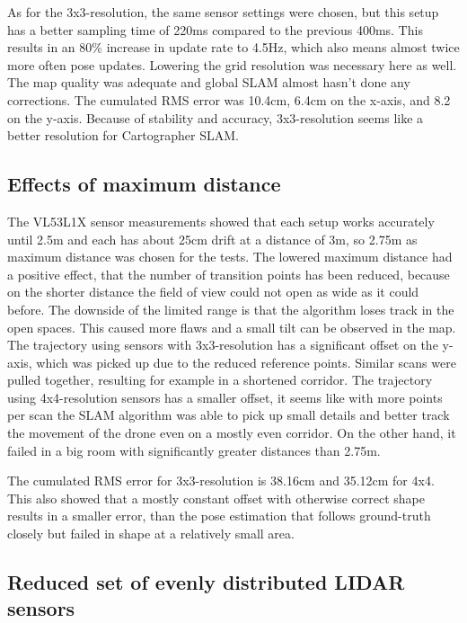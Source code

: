 \documentclass[conference]{IEEEtran}
\begin{document}
As for the 3x3-resolution, the same sensor settings were chosen, but this setup has a better sampling time of 
220ms compared to the previous 400ms. This results in an 80\% increase in update rate to 4.5Hz, which also 
means almost twice more often pose updates. Lowering the grid resolution was necessary here as well. The map 
quality was adequate and global SLAM almost hasn't done any corrections. The cumulated RMS error was 10.4cm, 
6.4cm on the x-axis, and 8.2 on the y-axis. Because of stability and accuracy, 3x3-resolution seems like a 
better resolution for Cartographer SLAM. 

\subsection{Effects of maximum distance}

The VL53L1X sensor measurements showed that each setup works accurately until 2.5m and each has about 25cm 
drift at a distance of 3m, so 2.75m as maximum distance was chosen for the tests. The lowered maximum 
distance had a positive effect, that the number of transition points has been reduced, because on the shorter 
distance the field of view could not open as wide as it could before. The downside of the limited range is 
that the algorithm loses track in the open spaces. This caused more flaws and a small tilt can be observed
in the map.  
The trajectory using sensors with 3x3-resolution has a significant offset on the y-axis, which was picked up 
due to the reduced reference points. Similar scans were pulled together, resulting for example in a shortened
corridor. 
The trajectory using 4x4-resolution sensors has a smaller offset, it seems like with more 
points per scan the SLAM algorithm was able to pick up small details and better track the movement of the 
drone even on a mostly even corridor. On the other hand, it failed in a big room with significantly greater 
distances than 2.75m.

The cumulated RMS error for 3x3-resolution is 38.16cm and 35.12cm for 4x4. This also showed that a mostly
constant offset with otherwise correct shape results in a smaller error, than the pose estimation that 
follows ground-truth closely but failed in shape at a relatively small area. 

\subsection{Reduced set of evenly distributed LIDAR sensors}
\end{document}

